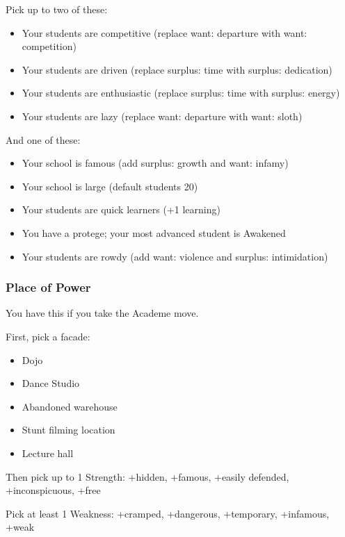 \documentclass[
]{article}
\providecommand{\tightlist}{%
  \setlength{\itemsep}{0pt}\setlength{\parskip}{0pt}}
\begin{document}
Pick up to two of these:

\begin{itemize}
\tightlist
\item
  Your students are competitive (replace want: departure with want:
  competition)
\item
  Your students are driven (replace surplus: time with surplus:
  dedication)
\item
  Your students are enthusiastic (replace surplus: time with surplus:
  energy)
\item
  Your students are lazy (replace want: departure with want: sloth)
\end{itemize}

And one of these:

\begin{itemize}
\tightlist
\item
  Your school is famous (add surplus: growth and want: infamy)
\item
  Your school is large (default students 20)
\item
  Your students are quick learners (+1 learning)
\item
  You have a protege; your most advanced student is Awakened
\item
  Your students are rowdy (add want: violence and surplus: intimidation)
\end{itemize}

\hypertarget{place-of-power-1}{%
\subsubsection{Place of Power}\label{place-of-power-1}}

You have this if you take the Academe move.

First, pick a facade:

\begin{itemize}
\tightlist
\item
  Dojo
\item
  Dance Studio
\item
  Abandoned warehouse
\item
  Stunt filming location
\item
  Lecture hall
\end{itemize}

Then pick up to 1 Strength: +hidden, +famous, +easily defended,
+inconspicuous, +free

Pick at least 1 Weakness: +cramped, +dangerous, +temporary, +infamous,
+weak
\end{document}
